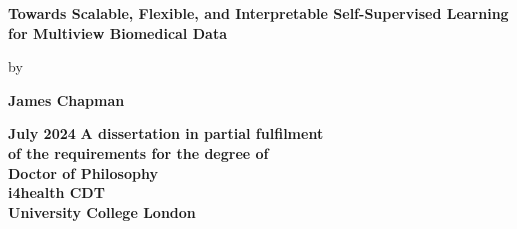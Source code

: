 \documentclass{report} %
\author{James Chapman}
\numberwithin{figure}{chapter}
\numberwithin{table}{section}
\begin{document}
\begin{titlepage}
    \centering
    {\LARGE\textbf{Towards Scalable, Flexible, and Interpretable Self-Supervised Learning for Multiview Biomedical Data}}
    \vspace{0.8cm}

    by

    \vspace{0.8cm}

    {\LARGE\textbf{James Chapman}}

    \vspace{1.5cm}

    {\LARGE\textbf{July 2024}}
    \vfill
    \textbf{
        A dissertation in partial fulfilment\\
        of the requirements for the degree of\\
        \textbf{Doctor of Philosophy}\\
        \vspace{1cm}
        i4health CDT\\
        University College London}
    \vspace{2cm}
\end{titlepage}

\onehalfspacing

\newpage



\newpage

\newpage
\dominitoc  %
\tableofcontents  %
\setcounter{tocdepth}{2}

\newpage
\listoffigures  %
\newpage
\listoftables  %

\newpage
\printglossary[type=\acronymtype, title=Acronyms]  %
\glsaddallunused[\acronymtype]
\newpage
\printglossary[type=symbols, title=Symbols List]  %
\glsaddallunused[symbols]
\newpage
\printglossary[type=main, title=Definitions]  %
\glsaddallunused[main]
\end{document}
